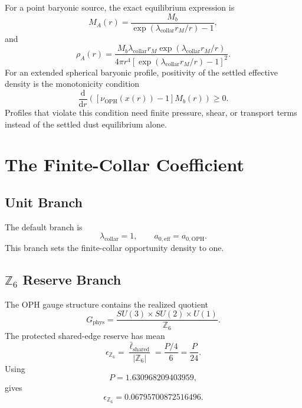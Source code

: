 \documentclass[11pt]{article}
\newcommand{\OPH}{\mathrm{OPH}}
\newcommand{\aoph}{a_{0,\mathrm{OPH}}}
\newcommand{\aeff}{a_{0,\mathrm{eff}}}
\newcommand{\lambdac}{\lambda_{\mathrm{collar}}}
\newcommand{\Zsix}{\mathbb Z_6}
\newcommand{\dd}{\mathrm{d}}
\begin{document}
For a point baryonic source, the exact equilibrium expression is
\begin{equation}
  M_A(r)
  =
  \frac{M_b}{\exp(\lambdac r_M/r)-1},
\end{equation}
and
\begin{equation}
  \rho_A(r)
  =
  \frac{
    M_b\lambdac r_M\exp(\lambdac r_M/r)
  }{
    4\pi r^4[\exp(\lambdac r_M/r)-1]^2
  }.
\end{equation}
For an extended spherical baryonic profile, positivity of the settled
effective density is the monotonicity condition
\begin{equation}
  \frac{\dd}{\dd r}
  \left(
    [\nu_{\OPH}(x(r))-1]M_b(r)
  \right)
  \ge 0.
\end{equation}
Profiles that violate this condition need finite pressure, shear, or transport
terms instead of the settled dust equilibrium alone.

\section{The Finite-Collar Coefficient}

\subsection{Unit Branch}

The default branch is
\begin{equation}
  \lambdac=1,
  \qquad
  \aeff=\aoph.
\end{equation}
This branch sets the finite-collar opportunity density to one.

\subsection{\(\Zsix\) Reserve Branch}

The OPH gauge structure contains the realized quotient
\begin{equation}
  G_{\mathrm{phys}}
    = \frac{SU(3)\times SU(2)\times U(1)}{\Zsix}.
\end{equation}
The protected shared-edge reserve has mean
\begin{equation}
  \epsilon_{\Zsix}
    = \frac{\bar\ell_{\mathrm{shared}}}{|\Zsix|}
    = \frac{P/4}{6}
    = \frac{P}{24}.
\end{equation}
Using
\begin{equation}
  P=1.630968209403959,
\end{equation}
gives
\begin{equation}
  \epsilon_{\Zsix}=0.06795700872516496.
\end{equation}
\end{document}
